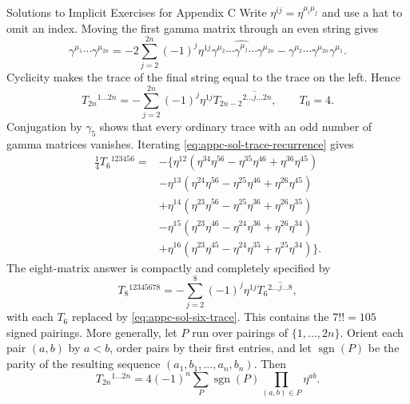 \begin{bankssolutions}{Solutions to Implicit Exercises for Appendix C}
Write $\eta^{ij}=\eta^{\mu_i\mu_j}$ and use a hat to omit an index.  Moving
the first gamma matrix through an even string gives
\[
 \gamma^{\mu_1}\cdots\gamma^{\mu_{2n}}
 =-2\sum_{j=2}^{2n}(-1)^j\eta^{1j}
   \gamma^{\mu_2}\cdots\widehat{\gamma^{\mu_j}}\cdots
   \gamma^{\mu_{2n}}
 -\gamma^{\mu_2}\cdots\gamma^{\mu_{2n}}\gamma^{\mu_1}.
\]
Cyclicity makes the trace of the final string equal to the trace on the
left.  Hence
\begin{equation}
 T_{2n}{}^{1\ldots 2n}
 =-\sum_{j=2}^{2n}(-1)^j\eta^{1j}
 T_{2n-2}{}^{2\ldots\widehat{j}\ldots 2n},
 \qquad T_0=4.
 \label{eq:appc-sol-trace-recurrence}
\end{equation}
Conjugation by $\gamma_5$ shows that every ordinary trace with an odd
number of gamma matrices vanishes.  Iterating
\eqref{eq:appc-sol-trace-recurrence} gives
\begin{equation}
\begin{aligned}
 \frac14T_6{}^{123456}={}&-\bigl\{
 \eta^{12}(\eta^{34}\eta^{56}-\eta^{35}\eta^{46}
                   +\eta^{36}\eta^{45})\\
 &-\eta^{13}(\eta^{24}\eta^{56}-\eta^{25}\eta^{46}
                   +\eta^{26}\eta^{45})\\
 &+\eta^{14}(\eta^{23}\eta^{56}-\eta^{25}\eta^{36}
                   +\eta^{26}\eta^{35})\\
 &-\eta^{15}(\eta^{23}\eta^{46}-\eta^{24}\eta^{36}
                   +\eta^{26}\eta^{34})\\
 &+\eta^{16}(\eta^{23}\eta^{45}-\eta^{24}\eta^{35}
                   +\eta^{25}\eta^{34})\bigr\}.
\end{aligned}
 \label{eq:appc-sol-six-trace}
\end{equation}
The eight-matrix answer is compactly and completely specified by
\[
 T_8{}^{12345678}
 =-\sum_{j=2}^{8}(-1)^j\eta^{1j}
   T_6{}^{2\ldots\widehat{j}\ldots8},
\]
with each $T_6$ replaced by \eqref{eq:appc-sol-six-trace}.  This contains the
$7!!=105$ signed pairings.  More generally, let $P$ run over pairings of
$\{1,\ldots,2n\}$.  Orient each pair $(a,b)$ by $a<b$, order pairs by
their first entries, and let $\operatorname{sgn}(P)$ be the parity of the
resulting sequence $(a_1,b_1,\ldots,a_n,b_n)$.  Then
\begin{equation}
 T_{2n}{}^{1\ldots2n}
 =4(-1)^n\sum_P\operatorname{sgn}(P)
   \prod_{(a,b)\in P}\eta^{ab}.
 \label{eq:appc-sol-trace-pairings}
\end{equation}


\end{bankssolutions}
